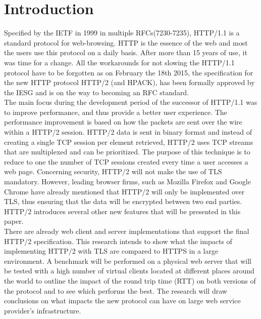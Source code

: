 \section{Introduction}
\label{chap:intro}
Specified by the IETF in 1999 in multiple RFCs(7230-7235\cite{RFC723x}), HTTP/1.1 is a standard protocol for web-browsing. HTTP is the essence of the web and most the users use this protocol on a daily basis. After more than 15 years of use, it was time for a change. All the workarounds for not slowing the HTTP/1.1 protocol have to be forgotten as on February the 18th 2015, the specification \cite{http2} for the new HTTP protocol HTTP/2 (and HPACK\cite{hpack}), has been formally approved by the IESG and is on the way to becoming an RFC standard.   \\
The main focus during the development period of the successor of HTTP/1.1 was to improve performance, and thus provide a better user experience. The performance improvement is based on how the packets are sent over the wire within a HTTP/2 session. HTTP/2 data is sent in binary format and instead of creating a single TCP session per element retrieved, HTTP/2 uses TCP streams that are multiplexed and can be prioritized. The purpose of this technique is to reduce to one the number of TCP sessions created every time a user accesses a web page. Concerning security, HTTP/2 will not make the use of TLS mandatory. However, leading browser firms, such as Mozilla Firefox and Google Chrome have already mentioned that HTTP/2 will only be implemented over TLS, thus ensuring that the data will be encrypted between two end parties. HTTP/2 introduces several other new features that will be presented in this paper. \\
There are already web client and server implementations\cite{http2-imp} that support the final HTTP/2 specification. This research intends to show what the impacts of implementing HTTP/2 with TLS are compared to HTTPS in a large environment. A benchmark will be performed on a physical web server that will be tested with a high number of virtual clients located at different places around the world to outline the impact of the round trip time (RTT) on both versions of the protocol and to see which performs the best. The research will draw conclusions on what impacts the new protocol can have on large web service provider's infrastructure.